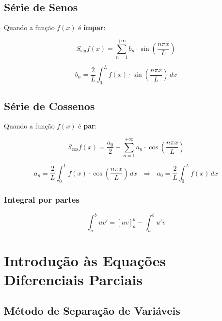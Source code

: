 \documentclass[11pt, a4paper]{article}
\begin{document}
\subsection{Série de Senos}

Quando a função $f(x)$ é \textbf{ímpar}:

\begin{equation*}
    S_{\sin} f(x) =
    \sum_{n=1}^{+\infty}b_n \cdot \sin\left(\frac{n\pi x}{L}\right)
\end{equation*}

\begin{equation*}
    b_n =
    \frac{2}{L} \int_{0}^{L} f(x) \cdot \sin\left(\frac{n\pi x}{L}\right) \, dx
\end{equation*}

\subsection{Série de Cossenos}

Quando a função $f(x)$ é \textbf{par}:

\begin{equation*}
    S_{\cos} f(x) = \frac{a_0}{2} + \sum_{n=1}^{+\infty}
    a_n \cdot \cos\left(\frac{n\pi x}{L}\right)
\end{equation*}

\begin{equation*}
    a_n =
    \frac{2}{L} \int_{0}^{L} f(x) \cdot \cos\left(\frac{n\pi x}{L}\right) \, dx
    \ \ \ \Rightarrow \ \ \
    a_0 =
    \frac{2}{L} \int_{0}^{L} f(x) \, dx
\end{equation*}

\subsubsection*{Integral por partes}

\begin{equation*}
    \int_a^b uv' = [uv] _a^b - \int_a^b u'v
\end{equation*}

\newpage

\section{Introdução às Equações Diferenciais Parciais}

\subsection{Método de Separação de Variáveis}
\end{document}
